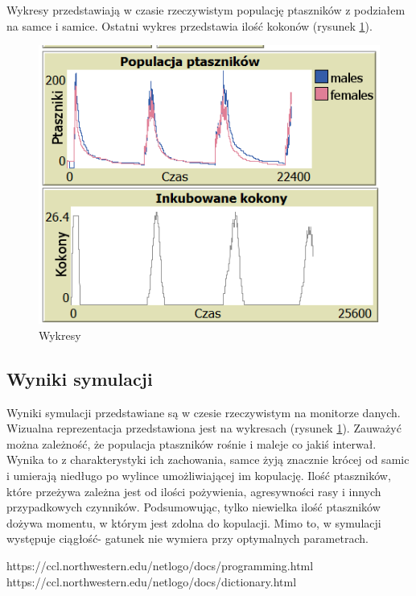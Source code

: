 \documentclass[a4paper,11pt,titlepage]{article}
\begin{document}
Wykresy przedstawiają w czasie rzeczywistym populację ptaszników z podziałem na samce i samice. Ostatni wykres przedstawia ilość kokonów (rysunek \ref{fig:10}).
\begin{figure}[H]
\centering
\includegraphics[width=.8\columnwidth]{img/wykresy.PNG}
\caption{Wykresy}
\label{fig:10}
\end{figure}

\subsection{Wyniki symulacji}
Wyniki symulacji przedstawiane są w czesie rzeczywistym na monitorze danych. Wizualna reprezentacja przedstawiona jest na wykresach (rysunek \ref{fig:10}). Zauważyć można zależność, że populacja ptaszników rośnie i maleje co jakiś interwał. Wynika to z charakterystyki ich zachowania, samce żyją znacznie krócej od samic i umierają niedługo po wylince umożliwiającej im kopulację. Ilość ptaszników, które przeżywa zależna jest od ilości pożywienia, agresywności rasy i innych przypadkowych czynników. Podsumowując, tylko niewielka ilość ptaszników dożywa momentu, w którym jest zdolna do kopulacji. Mimo to, w symulacji występuje ciągłość- gatunek nie wymiera przy optymalnych parametrach.

\newpage
{}
\listoffigures
\newpage

\listoftables

\begin{thebibliography}{5}
https://ccl.northwestern.edu/netlogo/docs/programming.html
https://ccl.northwestern.edu/netlogo/docs/dictionary.html

\end{thebibliography}
\end{document}
